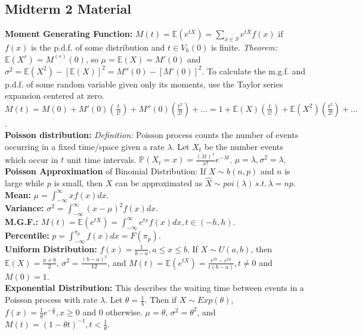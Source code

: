 \documentclass[10pt, twocolumn]{article}
\begin{document}
\subsection{Midterm 2 Material}
\textbf{Moment Generating Function:} $M(t) = \mathbb{E}(e^{tX}) = \sum_{x \in S}{e^{tX}f(x)}$ if $f(x)$ is the p.d.f. of some distribution and $t \in V_h(0)$ is finite. \textit{Theorem:} $\mathbb{E}(X^r) = M^{(r)}(0)$, so $\mu = \mathbb{E}(X) = M'(0)$ and $\sigma^2 = \mathbb{E}(X^2) - [\mathbb{E}(X)]^2 = M''(0) - [M'(0)]^2$. To calculate the m.g.f. and p.d.f. of some random variable given only its moments, use the Taylor series expansion centered at zero. $M(t) = M(0) + M'(0)\left(\frac{t}{1!}\right) + M''(0)\left(\frac{t^2}{2!}\right) + \dots = 1 + \mathbb{E}(X)\left(\frac{t}{1!}\right) + \mathbb{E}(X^2)\left(\frac{t^2}{2!}\right) + \dots$.\\
\textbf{Poisson distribution:} \textit{Definition:} Poisson process counts the number of events occurring in a fixed time/space given a rate $\lambda$. Let $X_t$ be the number events which occur in $t$ unit time intervals. $\mathbb{P}(X_t = x) = \frac{(\lambda t)^x}{x!} e^{-\lambda t}$. $\mu = \lambda, \sigma^2 = \lambda$.\\
\textbf{Poisson Approximation} of Binomial Distribution: If $X \sim b(n,p)$ and $n$ is large while $p$ is small, then $X$ can be approximated as $\hat{X} \sim poi(\lambda) \, s.t. \, \lambda = np$.\\
\textbf{Mean:} $\mu = \int_{-\infty}^{\infty} x f(x) dx$.\\
\textbf{Variance:} $\sigma^2 = \int_{-\infty}^{\infty} (x - \mu)^2 f(x) dx$.\\
\textbf{M.G.F.:} $M(t) = \mathbb{E}(e^{tX}) = \int_{-\infty}^{\infty} e^{tx} f(x) dx, t \in (-h,h)$.\\
\textbf{Percentile:} $p = \int_{-\infty}^{\pi_p} f(x) dx = F(\pi_p)$.\\
\textbf{Uniform Distribution:} $f(x) = \frac{1}{b-a}, a \leq x \leq b$. If $X \sim U(a,b)$, then $\mathbb{E}(X) = \frac{a+b}{2}$, $\sigma^2 = \frac{(b-a)^2}{12}$, and $M(t) = \mathbb{E}(e^{tX}) = \frac{e^{tb} - e^{ta}}{t(b-a)}, t \neq 0$ and $M(0) = 1$.\\
\textbf{Exponential Distribution:} This describes the waiting time between events in a Poisson process with rate $\lambda$. Let $\theta = \frac{1}{\lambda}$. Then if $X \sim Exp(\theta)$, $f(x) = \frac{1}{\theta}e^{-\frac{x}{\theta}}, x \geq 0$ and 0 otherwise. $\mu = \theta$, $\sigma^2 = \theta^2$, and $M(t) = (1 - \theta t)^{-1}, t < \frac{1}{\theta}$.\\
\end{document}
